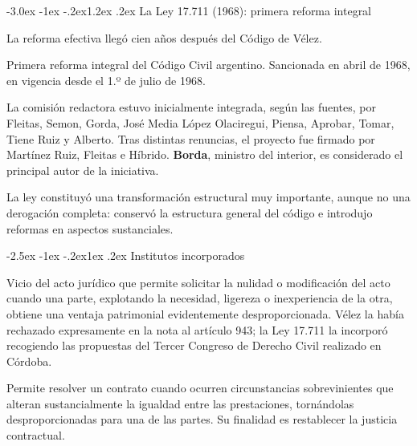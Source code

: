 \documentclass[12pt,oneside]{book}
\makeatletter
\renewcommand\section{\@startsection{section}{1}{\z@}%
  {-3.0ex \@plus -1ex \@minus -.2ex}{1.2ex \@plus .2ex}%
  {\normalfont\large\bfseries\color{acento}}}
\renewcommand\subsection{\@startsection{subsection}{2}{\z@}%
  {-2.5ex \@plus -1ex \@minus -.2ex}{1ex \@plus .2ex}%
  {\normalfont\normalsize\bfseries}}
\makeatother
\begin{document}
\section{La Ley 17.711 (1968): primera reforma integral}

La reforma efectiva llegó cien años después del Código de Vélez.

\begin{importante}[Ley 17.711 (1968)]
Primera reforma integral del Código Civil argentino. Sancionada en abril de 1968, en vigencia desde el 1.º de julio de 1968.
\end{importante}

La comisión redactora estuvo inicialmente integrada, según las fuentes, por Fleitas, Semon, Gorda, José Media López Olaciregui, Piensa, Aprobar, Tomar, Tiene Ruiz y Alberto. Tras distintas renuncias, el proyecto fue firmado por Martínez Ruiz, Fleitas e Híbrido. \textbf{Borda}, ministro del interior, es considerado el principal autor de la iniciativa.

La ley constituyó una transformación estructural muy importante, aunque no una derogación completa: conservó la estructura general del código e introdujo reformas en aspectos sustanciales.

\subsection{Institutos incorporados}

\begin{definicion}
Vicio del acto jurídico que permite solicitar la nulidad o modificación del acto cuando una parte, explotando la necesidad, ligereza o inexperiencia de la otra, obtiene una ventaja patrimonial evidentemente desproporcionada. Vélez la había rechazado expresamente en la nota al artículo 943; la Ley 17.711 la incorporó recogiendo las propuestas del Tercer Congreso de Derecho Civil realizado en Córdoba.
\end{definicion}

\begin{definicion}
Permite resolver un contrato cuando ocurren circunstancias sobrevinientes que alteran sustancialmente la igualdad entre las prestaciones, tornándolas desproporcionadas para una de las partes. Su finalidad es restablecer la justicia contractual.
\end{definicion}
\end{document}
